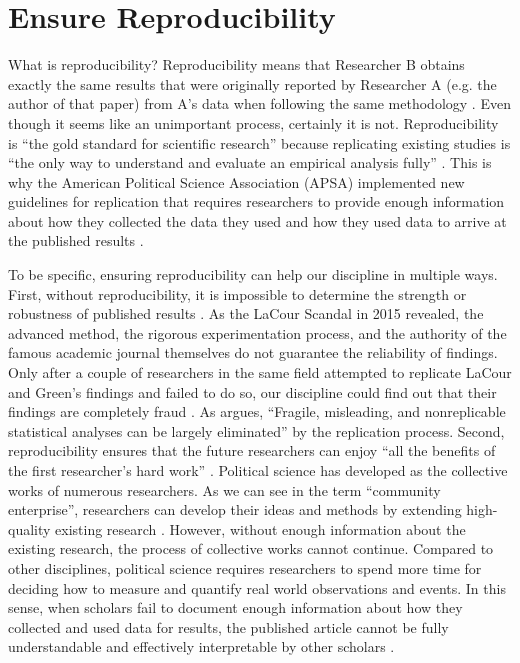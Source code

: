 
\section{Ensure Reproducibility}

What is reproducibility? Reproducibility means that Researcher B obtains exactly the same results that were originally reported by Researcher A (e.g. the author of that paper) from A’s data when following the same methodology \citep{Brunswik1955; Asendorpf2013}. Even though it seems like an unimportant process, certainly it is not. Reproducibility is ``the gold standard for scientific research'' \citep[1]{Janz2015} because replicating existing studies is ``the only way to understand and evaluate an empirical analysis fully'' \citep[444]{King1995}. This is why the American Political Science Association (APSA) implemented new guidelines for replication that requires researchers to provide enough information about how they collected the data they used and how they used data to arrive at the published results \citep{Lupia2014}.

To be specific, ensuring reproducibility can help our discipline in multiple ways. First, without reproducibility, it is impossible to determine the strength or robustness of published results \citep{Lupia2014}. As the LaCour Scandal in 2015 revealed, the advanced method, the rigorous experimentation process, and the authority of the famous academic journal themselves do not guarantee the reliability of findings. Only after a couple of researchers in the same field attempted to replicate LaCour and Green’s findings and failed to do so, our discipline could find out that their findings are completely fraud \citep{Young2015}. As \citet[62]{Dafoe2014} argues, ``Fragile, misleading, and nonreplicable statistical analyses can be largely eliminated'' by the replication process. 
Second, reproducibility ensures that the future researchers can enjoy ``all the benefits of the first researcher’s hard work'' \citep[445]{King1995}.  Political science has developed as the collective works of numerous researchers. As we can see in the term ``community enterprise'', researchers can develop their ideas and methods by extending high-quality existing research \citep{King1995}. However, without enough information about the existing research, the process of collective works cannot continue. Compared to other disciplines, political science requires researchers to spend more time for deciding how to measure and quantify real world observations and events. In this sense, when scholars fail to document enough information about how they collected and used data for results, the published article cannot be fully understandable and effectively interpretable by other scholars \citep{Lupia2010}.

